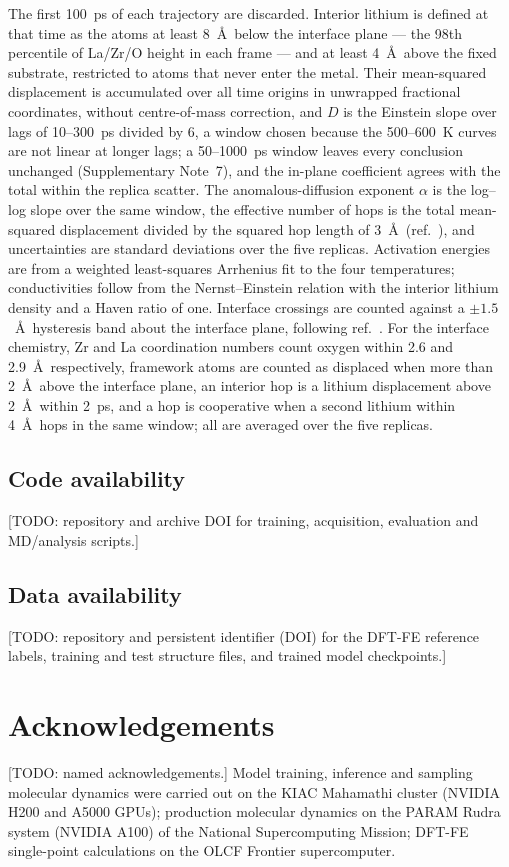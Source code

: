 \documentclass[11pt]{article}
\begin{document}
The first 100~ps of each trajectory are discarded. Interior lithium is defined
at that time as the atoms at least 8~\AA\ below the interface plane --- the 98th
percentile of La/Zr/O height in each frame --- and at least 4~\AA\ above the
fixed substrate, restricted to atoms that never enter the metal. Their
mean-squared displacement is accumulated over all time origins in unwrapped
fractional coordinates, without centre-of-mass correction, and $D$ is the
Einstein slope over lags of 10--300~ps divided by 6, a window chosen because
the 500--600~K curves are not linear at longer lags; a 50--1000~ps window
leaves every conclusion unchanged (Supplementary Note~7), and the in-plane
coefficient agrees with the total within the replica scatter. The anomalous-diffusion exponent
$\alpha$ is the log--log slope over the same window, the effective number of
hops is the total mean-squared displacement divided by the squared hop length of
3~\AA\ (ref.~), and uncertainties are standard deviations over
the five replicas. Activation energies are from a weighted least-squares
Arrhenius fit to the four temperatures; conductivities follow from the
Nernst--Einstein relation with the interior lithium density and a Haven ratio
of one. Interface crossings are counted against a $\pm1.5$~\AA\ hysteresis band
about the interface plane, following ref.~. For the
interface chemistry, Zr and La coordination numbers count oxygen within 2.6 and
2.9~\AA\ respectively, framework atoms are counted as displaced when more than
2~\AA\ above the interface plane, an interior hop is a lithium displacement
above 2~\AA\ within 2~ps, and a hop is cooperative when a second lithium within
4~\AA\ hops in the same window; all are averaged over the five replicas.

\subsection*{Code availability}
[TODO: repository and archive DOI for training, acquisition, evaluation and
MD/analysis scripts.]

\subsection*{Data availability}
[TODO: repository and persistent identifier (DOI) for the DFT-FE reference
labels, training and test structure files, and trained model checkpoints.]

\section*{Acknowledgements}
[TODO: named acknowledgements.] Model training, inference and sampling
molecular dynamics were carried out on the KIAC Mahamathi cluster (NVIDIA H200
and A5000 GPUs); production molecular dynamics on the PARAM Rudra system (NVIDIA
A100) of the National Supercomputing Mission; DFT-FE single-point calculations
on the OLCF Frontier supercomputer.
\end{document}
